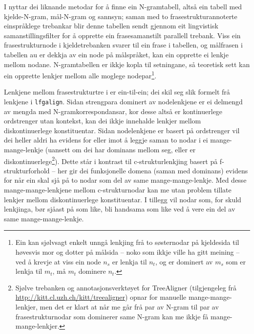 \documentclass[11pt,a4paper,oneside,draft]{book}
\begin{document}
 I \citet{samuelsson2007apa} nyttar dei liknande metodar for å finne
 ein N-gramtabell, altså ein tabell med kjelde-N-gram, mål-N-gram og
 sannsyn; saman med to frasestrukturannoterte einspråklege trebankar
 blir denne tabellen sendt gjennom eit lingvistisk
 samanstillingsfilter for å opprette ein frasesamanstilt parallell
 trebank. Viss ein frasestrukturnode i kjeldetrebanken svarer til ein
 frase i tabellen, og målfrasen i tabellen au er dekkja av ein node på
 målspråket, kan ein opprette ei lenkje mellom nodane.  N-gramtabellen
 er ikkje kopla til setningane, så teoretisk sett kan ein opprette
 lenkjer mellom alle moglege nodepar\footnote{Ein kan sjølvsagt enkelt unngå lenkjing frå to søsternodar på
        kjeldesida til høvesvis mor og dotter på målsida -- noko som
        ikkje ville ha gitt meining -- ved å krevje at viss ein node
        $n_s$ er lenkja til $n_t$, og er dominert av $m_s$ som er
        lenkja til $m_t$, må $m_t$ dominere $n_t$. }. 

 Lenkjene mellom frasestrukturtre i \citet{samuelsson2007apa} er
 ein-til-ein; dei skil seg slik formelt frå lenkjene i
 \texttt{lfgalign}. Sidan strengpara dominert av nodelenkjene er ei delmengd
 av mengda med N-gramkorrespondansar, kor desse altså er kontinuerlege
 ordstrenger utan kontekst, kan dei ikkje innehalde lenkjer mellom
 diskontinuerlege konstituentar. Sidan nodelenkjene er basert på
 ordstrenger vil dei heller aldri ha evidens for eller imot å leggje
 saman to nodar i ei mange-mange-lenkje (uansett om dei har dominans
 mellom seg, eller er diskontinuerlege\footnote{Sjølve trebanken \citep{samuelsson2006pap} og
        annotasjonsverktøyet for TreeAligner (tilgjengeleg frå
        \href{http://kitt.cl.uzh.ch/kitt/treealigner}{http://kitt.cl.uzh.ch/kitt/treealigner}) opnar for manuelle
        mange-mange-lenkjer, men det er klart at når me går frå par av
        N-gram til par av frasestrukturnodar som dominerer same N-gram
        kan me ikkje få mange-mange-lenkjer. }). Dette står i kontrast
 til c-strukturlenkjing basert på f-strukturforhold -- her gir dei
 funksjonelle domena (saman med dominans) evidens for når ein skal sjå
 på to nodar som del av same mange-mange-lenkje.  Med desse
 mange-mange-lenkjene mellom c-strukturnodar kan me utan problem
 tillate lenkjer mellom diskontinuerlege konstituentar. I tillegg vil
 nodar som, for skuld lenkjinga, bør sjåast på som like, bli handsama
 som like ved å vere ein del av same mange-mange-lenkje.
 
\end{document}

